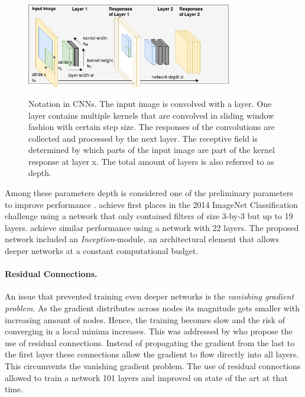 \begin{figure}[hbtp]
	\centering
	\includegraphics[width=0.8\textwidth]{fig/model_design}
	\label{fig:model_design}
	\caption{Notation in \acp{CNN}. The input image is convolved with a layer. One layer contains multiple kernels that are convolved in sliding window fashion with certain step size. The responses of the convolutions are collected and processed by the next layer. The receptive field is determined by which parts of the input image are part of the kernel response at layer x. The total amount of layers is also referred to as depth.}
\end{figure}

Among these parameters depth is considered one of the preliminary parameters to improve performance \cite{He}. \citeauthor{Simonyan2014} \cite{Simonyan2014} achieve first places in the 2014 ImageNet Classification challenge using a network that only contained filters of size 3-by-3 but up to 19 layers. \citeauthor{Szegedy2014} \cite{Szegedy2014} achieve similar performance using a network with 22 layers. The proposed network included an \textit{Inception}-module, an architectural element that allows deeper networks at a constant computational budget. 

\paragraph{Residual Connections.}

An issue that prevented training even deeper networks is the \textit{vanishing gradient problem}. As the gradient distributes across nodes its magnitude gets smaller with increasing amount of nodes. Hence, the training becomes slow and the risk of converging in a local minima increases. This was addressed by \citeauthor{He2015} \cite{He2015} who propose the use of residual connections. Instead of propagating the gradient from the last to the first layer these connections allow the gradient to flow directly into all layers. This circumvents the vanishing gradient problem. The use of residual connections allowed to train a network 101 layers and improved on state of the art at that time.

